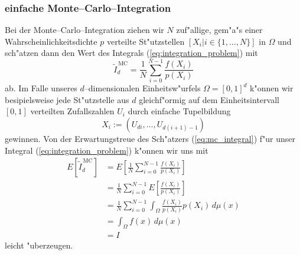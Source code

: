 	\subsubsection{einfache Monte--Carlo--Integration}
	Bei der Monte--Carlo--Integration ziehen wir $N$ zuf"allige, gem"a"s einer Wahrscheinlichkeitsdichte $p$ verteilte St"utzstellen $[X_i|i\in\{1,\dots,N\}]$ in $\Omega$ und sch"atzen dann den Wert des Integrals (\ref{eq:integration_problem}) mit
	\begin{equation}
		{\tilde I}_d^{\,\text{MC}}=\frac{1}{N}\sum_{i=0}^{N-1} \frac{f(X_i)}{p(X_i)}
		\label{eq:mc_integral}
	\end{equation}
	ab. Im Falle unseres $d$--dimensionalen Einheitsw"urfels $\Omega=[0,1]^d$ k"onnen wir besipielsweise jede St"utzstelle aus $d$ gleichf"ormig auf dem Einheitsintervall $[0,1]$ verteilten Zufallszahlen $U_i$ durch einfache Tupelbildung
	$$X_i:=(U_{d i},\dots,U_{d(i+1)-1})$$
	gewinnen. Von der Erwartungstreue des Sch"atzers (\ref{eq:mc_integral}) f"ur unser Integral (\ref{eq:integration_problem}) k"onnen wir uns mit \citep[][2.4]{Veach:1997p9136}
	\begin{align*}
		E[{\tilde I}_d^{\,\text{MC}}] &=E\left[\frac{1}{N}\sum_{i=0}^{N-1}\frac{f(X_i)}{p(X_i)}\right] \\
			&= \frac{1}{N}\sum_{i=0}^{N-1}E\left[\frac{f(X_i)}{p(X_i)}\right] \\
			&= \frac{1}{N}\sum_{i=0}^{N-1}\int_\Omega \frac{f(X_i)}{p(X_i)}p(X_i)\,d\mu(x) \\
			&= \int_\Omega f(x)\,d\mu(x)\\
			&= I
	\end{align*}
	leicht "uberzeugen.
	
